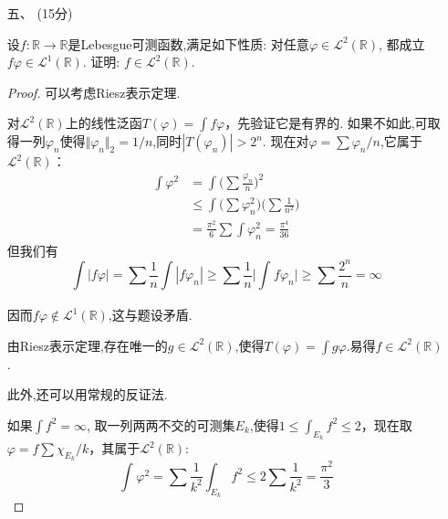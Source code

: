 \begin{itemize}
\begin{proof}
由Fatou引理,
$$\int_{\mathbb{R}}|f^{\prime}(x)|^2 \text{d} x
=\int_{\mathbb{R}} \liminf_{t \rightarrow 0} \frac{|f(x+t)-f(x)|^2}{t^2} \text{d} x 
\leq \liminf_{t \rightarrow 0} I_t(f).$$
另一方面, 由Cauchy--Schwarz不等式,
$$|f(x+t)-f(x)|^2=\left|\int_x^{x+t} f^{\prime}(y) \text{d}y\right|^2 
\leq t \int_x^{x+t} f^{\prime}(y)^2 \text{d}y.$$
故
$$I_t(f) \leq \int_{\mathbb{R}} \int_x^{x+t} \frac{f^{\prime}(y)^2}{t} \text{d}y \text{d}x.$$
由Tonelli (Fubini)定理, 上式右边
$$
	=\frac{1}{t} \int_{\mathbb{R}} f^{\prime}(y)^2\left(\int_{y-t \leq x \leq y} d x\right) \text{d} y=\int_{\mathbb{R}} f^{\prime}(y)^2 \text{d} y .
$$
因此 $I_t(f) \leq \int_{\mathbb{R}}|f^{\prime}(y)|^2 \text{d} y$ 对所有的 $t>0$ 成立. 故待证等式成立.
\end{proof}

\item[五、](15分)

设$ f\colon \mathbb{R} \to \mathbb{R}  $是Lebesgue可测函数,满足如下性质:
对任意$\varphi\in \mathcal{L}^{2}(\mathbb{R})$,
都成立$f\varphi\in \mathcal{L}^{1}(\mathbb{R})$.
证明: $f\in \mathcal{L}^{2}(\mathbb{R})$.

\begin{proof}
可以考虑Riesz表示定理.

对$ \mathcal{L}^{2}(\mathbb{R}) $上的线性泛函$ T(\varphi)=\int f\varphi $，先验证它是有界的.
如果不如此,可取得一列$ \varphi_{n} $使得$ \Vert \varphi_{n} \Vert_{2}=1/n $,同时$ |T(\varphi_{n})|>2^{n} $.
现在对$\varphi=\sum \varphi_{n}/n$,它属于$\mathcal{L}^{2}(\mathbb{R})$：
\begin{align*}
    \int{\varphi ^2}&=\int{\bigg( \sum{\frac{\varphi_n}{n}} \bigg)^2}\\
    &\le \int{\Big( \sum{\varphi_{n}^{2}} \Big) \bigg( \sum{\frac{1}{n^2}} \bigg)}\\
    &=\frac{\pi^2}{6}\sum{\int{\varphi_{n}^{2}}}=\frac{\pi^4}{36}
\end{align*}
但我们有
$$\int{|f\varphi|}=\sum{\frac{1}{n}\int{|f\varphi_n|}}
\ge \sum{\frac{1}{n}\bigg|\int_{}^{}{f\varphi_n}\bigg|}
\ge \sum{\frac{2^n}{n}}=\infty $$

因而$ f\varphi\notin \mathcal{L} ^{1}(\mathbb{R} ) $,这与题设矛盾.

由Riesz表示定理,存在唯一的$ g\in \mathcal{L} ^{2}(\mathbb{R} ) $,使得$ T(\varphi)=\int g\varphi  $.易得$ f\in \mathcal{L} ^{2}(\mathbb{R}) $.

此外,还可以用常规的反证法.

如果$ \int f^{2}=\infty $,
取一列两两不交的可测集$ E_{k} $,使得$
1\le \int_{E_k}^{}{f^2}\le 2$，现在取$ \varphi=f\sum \chi _{E_{k}}/k $，其属于$ \mathcal{L} ^{2}(\mathbb{R}) $:
$$
\int_{}^{}{\varphi ^2}=\sum_{}^{}{\frac{1}{k^2}\int_{E_k}^{}{f^2}\le 2\sum_{}^{}{\frac{1}{k^2}}=\frac{\pi ^2}{3}}
$$


\end{proof}
\end{itemize}

